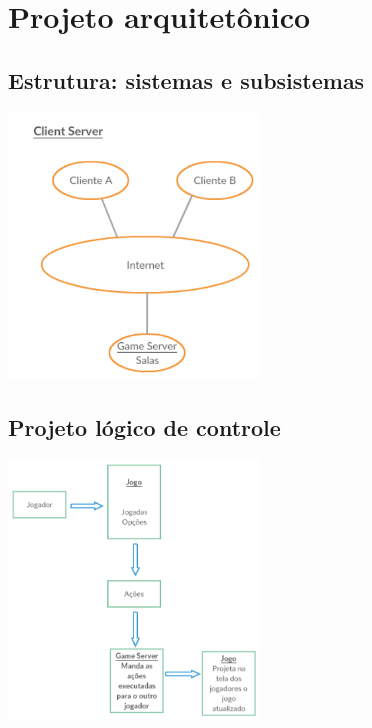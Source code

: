 \section{Projeto arquitetônico}

\subsection{Estrutura: sistemas e subsistemas}
\includegraphics[width=0.5\textwidth]{arquiteturaSistemas.pdf}

\subsection{Projeto lógico de controle}
\includegraphics[width=0.5\textwidth]{arquiteturaControle.pdf}
